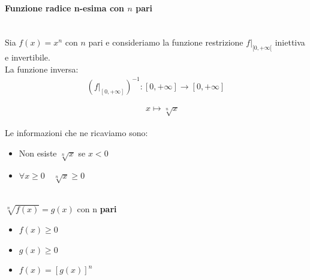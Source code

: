 \documentclass[12pt]{report}
\begin{document}
	\paragraph{Funzione radice n-esima con $n$ pari} \quad \\
	Sia $f(x) = x^n$ con $n$ pari e consideriamo la funzione restrizione $f|_{[0,+\infty[}$ iniettiva e invertibile. \\
	La funzione inversa:
	\[
	\begin{array}{l}
		(f|_{[0, +\infty]})^{-1}: [0, +\infty] \to [0, +\infty]\\
		\phantom{(f|_{[0, +\infty]})^{-1}:\ } x \mapsto \sqrt[n]{x}
	\end{array}
	\]
	\begin{center}
	\end{center}
	Le informazioni che ne ricaviamo sono:
	\begin{itemize}
		\item Non esiste $\sqrt[n]{x}$ se $x < 0$
		\item $\forall x \geq 0 \quad \sqrt[n]{x} \geq 0$
	\end{itemize}
	\begin{note}{}{} \quad \\
		$\sqrt[n]{f(x)} = g(x)$ con n \textbf{pari}
		\begin{itemize}
			\item $f(x) \geq 0$
			\item $g(x) \geq 0$
			\item $f(x) = [g(x)]^n$
		\end{itemize}
	\end{note}
\end{document}
